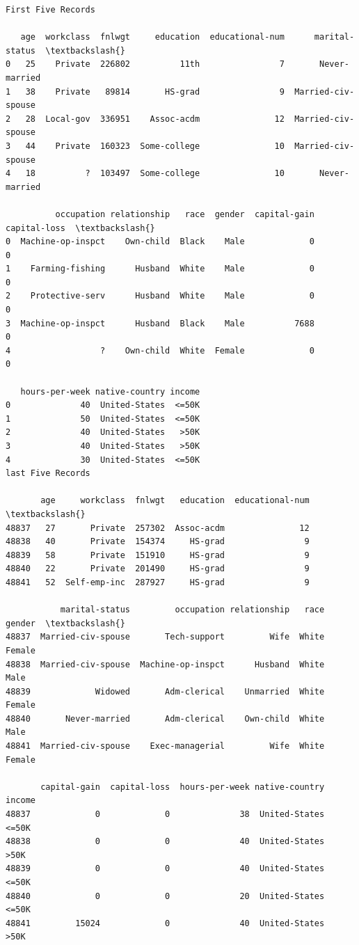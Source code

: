 \documentclass[11pt]{article}
\begin{document}
    \begin{Verbatim}[commandchars=\\\{\}]
First Five Records

   age  workclass  fnlwgt     education  educational-num      marital-status  \textbackslash{}
0   25    Private  226802          11th                7       Never-married
1   38    Private   89814       HS-grad                9  Married-civ-spouse
2   28  Local-gov  336951    Assoc-acdm               12  Married-civ-spouse
3   44    Private  160323  Some-college               10  Married-civ-spouse
4   18          ?  103497  Some-college               10       Never-married

          occupation relationship   race  gender  capital-gain  capital-loss  \textbackslash{}
0  Machine-op-inspct    Own-child  Black    Male             0             0
1    Farming-fishing      Husband  White    Male             0             0
2    Protective-serv      Husband  White    Male             0             0
3  Machine-op-inspct      Husband  Black    Male          7688             0
4                  ?    Own-child  White  Female             0             0

   hours-per-week native-country income
0              40  United-States  <=50K
1              50  United-States  <=50K
2              40  United-States   >50K
3              40  United-States   >50K
4              30  United-States  <=50K
last Five Records

       age     workclass  fnlwgt   education  educational-num  \textbackslash{}
48837   27       Private  257302  Assoc-acdm               12
48838   40       Private  154374     HS-grad                9
48839   58       Private  151910     HS-grad                9
48840   22       Private  201490     HS-grad                9
48841   52  Self-emp-inc  287927     HS-grad                9

           marital-status         occupation relationship   race  gender  \textbackslash{}
48837  Married-civ-spouse       Tech-support         Wife  White  Female
48838  Married-civ-spouse  Machine-op-inspct      Husband  White    Male
48839             Widowed       Adm-clerical    Unmarried  White  Female
48840       Never-married       Adm-clerical    Own-child  White    Male
48841  Married-civ-spouse    Exec-managerial         Wife  White  Female

       capital-gain  capital-loss  hours-per-week native-country income
48837             0             0              38  United-States  <=50K
48838             0             0              40  United-States   >50K
48839             0             0              40  United-States  <=50K
48840             0             0              20  United-States  <=50K
48841         15024             0              40  United-States   >50K


\end{Verbatim}
\end{document}
